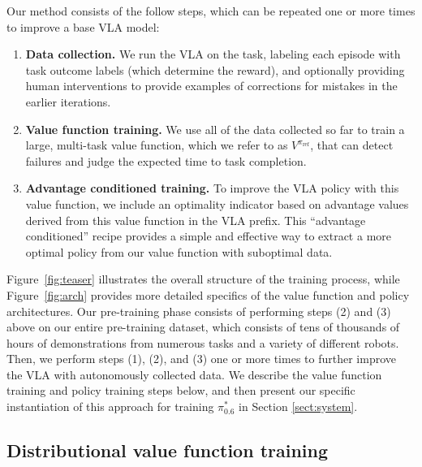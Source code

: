 \documentclass[conference]{IEEEtran}
\newcommand{\piref}{\pi_\text{ref}}
\def \ModelSymbol {$\pi^{*}_{0.6}$}
\begin{document}
Our method consists of the follow steps, which can be repeated one or more times to improve a base VLA model:
\begin{enumerate}
    \item \textbf{Data collection.} We run the VLA on the task, labeling each episode with task outcome labels (which determine the reward), and optionally providing human interventions to provide examples of corrections for mistakes in the earlier iterations.
    \item \textbf{Value function training.} We use all of the data collected so far to train a large, multi-task value function, which we refer to as $V^{\piref}$, that can detect failures and judge the expected time to task completion.
    \item \textbf{Advantage conditioned training.} To improve the VLA policy with this value function, we include an optimality indicator based on advantage values derived from this value function in the VLA prefix. This ``advantage conditioned'' recipe provides a simple and effective way to extract a more optimal policy from our value function with suboptimal data.
\end{enumerate}
Figure~\ref{fig:teaser} illustrates the overall structure of the training process, while Figure~\ref{fig:arch} provides more detailed specifics of the value function and policy architectures.
Our pre-training phase consists of performing steps (2) and (3) above on our entire pre-training dataset, which consists of tens of thousands of hours of demonstrations from numerous tasks and a variety of different robots. Then, we perform steps (1), (2), and (3) one or more times to further improve the VLA with autonomously collected data.
We describe the value function training and policy training steps below, and then present our specific instantiation of this approach for training \ModelSymbol{} in Section \ref{sect:system}.



\subsection{Distributional value function training}
\label{sect:vf_train}
\end{document}
